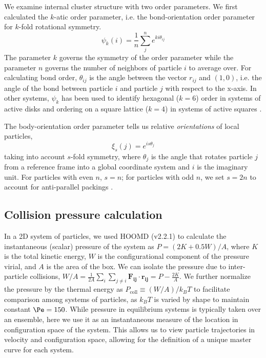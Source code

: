 We examine internal cluster structure with two order parameters.
We first calculated the $k$-atic order parameter, i.e. the bond-orientation order parameter for $k$-fold rotational symmetry.
\begin{equation}
\psi_k(i) = \frac{1}{n} \sum_j^n e^{ki\theta_{ij}}
\end{equation}
The parameter $k$ governs the symmetry of the order parameter while the parameter $n$ governs the number of neighbors of particle $i$ to average over.
For calculating bond order, $\theta_{ij}$ is the angle between the vector $r_{ij}$ and $(1,0)$, i.e. the angle of the bond between particle $i$ and particle $j$ with respect to the x-axis.
In other systems, $\psi_k$ has been used to identify hexagonal ($k=6$) order in systems of active disks \cite{Redner_2013_PRL} and ordering on a square lattice ($k=4$) in systems of active squares \cite{Prymidis_2016_SoftMatter}.

The body-orientation order parameter tells us relative \textit{orientations} of local particles,
\begin{equation}
\xi_s(j)=e^{{i}s\theta_j}
\end{equation}
taking into account $s$-fold symmetry, where $\theta_j$ is the angle that rotates particle $j$ from a reference frame into a global coordinate system and $i$ is the imaginary unit.
For particles with even $n$, $s=n$; for particles with odd $n$, we set $s=2n$ to account for anti-parallel packings \cite{Atkinson_2012_PRE}.


\subsection{Collision pressure calculation}
\label{sec:collision-pressure}

In a 2D system of particles, we used HOOMD (v2.2.1) to calculate the instantaneous (scalar) pressure of the system as $P=(2K + 0.5W)/A$, where $K$ is the total kinetic energy, $W$ is the configurational component of the pressure virial, and $A$ is the area of the box.
We can isolate the pressure due to inter-particle collisions, $W/A=\frac{1}{2A}\sum_i\sum_{j\neq{i}}\bm{F_{ij}}\cdot\bm{r_{ij}}=P-\frac{2K}{A}$.
We further normalize the pressure by the thermal energy as $P_\text{coll}\equiv(W/A)/k_BT$ to facilitate comparison among systems of particles, as $k_BT$ is varied by shape to maintain constant $\Pe=150$.
While pressure in equilibrium systems is typically taken over an ensemble, here we use it as an instantaneous measure of the location in configuration space of the system.
This allows us to view particle trajectories in velocity and configuration space, allowing for the definition of a unique master curve for each system.


